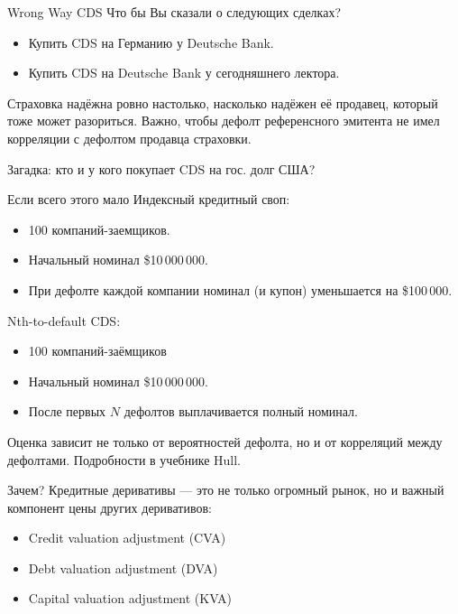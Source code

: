 \documentclass{beamer}
\newcommand{\insertdisclaimerframe}{
	}
\begin{document}
\begin{frame}{Wrong Way CDS}
\justify
Что бы Вы сказали о следующих сделках?
\begin{itemize}
\item Купить CDS на Германию у Deutsche Bank.
\item Купить CDS на Deutsche Bank у сегодняшнего лектора.
\end{itemize}

\justify
Страховка надёжна ровно настолько, насколько надёжен её продавец, который тоже может разориться. Важно, чтобы дефолт референсного эмитента не имел корреляции с дефолтом продавца страховки.

\justify
Загадка: кто и у кого покупает CDS на гос. долг США?
\end{frame}



\begin{frame}{Если всего этого мало}
\justify
Индексный кредитный своп:
\begin{itemize}
\item 100 компаний-заемщиков.
\item Начальный номинал \$10\,000\,000.
\item При дефолте каждой компании номинал (и купон) уменьшается на \$100\,000.
\end{itemize}

Nth-to-default CDS:
\begin{itemize}
\item 100 компаний-заёмщиков
\item Начальный номинал \$10\,000\,000.
\item После первых $N$ дефолтов выплачивается полный номинал.
\end{itemize}
Оценка зависит не только от вероятностей дефолта, но и от корреляций между дефолтами. Подробности в учебнике Hull.
\end{frame}



\begin{frame}{Зачем?}
\justify
Кредитные деривативы --- это не только огромный рынок, но и важный компонент цены других деривативов:
\begin{itemize}
\item Credit valuation adjustment (CVA)
\item Debt valuation adjustment (DVA)
\item Capital valuation adjustment (KVA)
\end{itemize}
\end{frame}


\insertdisclaimerframe
\end{document}

